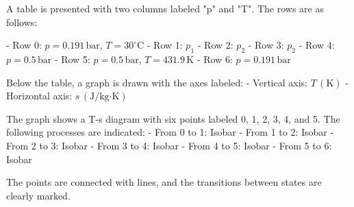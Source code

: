 A table is presented with two columns labeled "p" and "T". The rows are as follows:  

- Row 0: \( p = 0.191 \, \text{bar} \), \( T = 30^\circ \text{C} \)  
- Row 1: \( p_1 \)  
- Row 2: \( p_2 \)  
- Row 3: \( p_2 \)  
- Row 4: \( p = 0.5 \, \text{bar} \)  
- Row 5: \( p = 0.5 \, \text{bar} \), \( T = 431.9 \, \text{K} \)  
- Row 6: \( p = 0.191 \, \text{bar} \)  

Below the table, a graph is drawn with the axes labeled:  
- Vertical axis: \( T \, (\text{K}) \)  
- Horizontal axis: \( s \, (\text{J/kg·K}) \)  

The graph shows a T-s diagram with six points labeled 0, 1, 2, 3, 4, and 5. The following processes are indicated:  
- From 0 to 1: Isobar  
- From 1 to 2: Isobar  
- From 2 to 3: Isobar  
- From 3 to 4: Isobar  
- From 4 to 5: Isobar  
- From 5 to 6: Isobar  

The points are connected with lines, and the transitions between states are clearly marked.